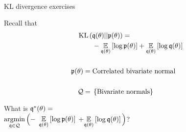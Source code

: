 \begin{frame}{KL divergence exercises}
\hspace{-3em}
\begin{minipage}{0.5\textwidth}
%
Recall that
\begin{align*}
%
\MoveEqLeft
\kl{\q(\theta)}{\p(\theta)} ={}\\&
-\expect{\q(\theta)}{\log \p(\theta)} +
\expect{\q(\theta)}{\log \q(\theta)}\\ \\
\p(\theta) ={}& \textrm{Correlated bivariate normal}\\ \\
\qdom ={}& \left\{ \textrm{Bivariate normals}\right\}
%
\end{align*}

What is $\mathfrak{q}^*(\theta) = $\\
$\underset{\mathfrak{q} \in \mathcal{Q}}{\mathrm{argmin}}\, \Big(-$
\sout{$\underset{\mathfrak{q}(\theta)}{\mathbb{E}}\left[\log \mathfrak{p}(\theta)\right]$}
$+ \underset{\mathfrak{q}(\theta)}{\mathbb{E}}\left[\log \mathfrak{q}(\theta)\right] \Big)$?
%
\end{minipage}
%
\begin{minipage}{0.4\textwidth}

\end{minipage}

\end{frame}





